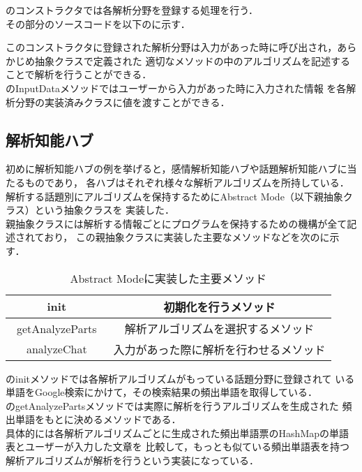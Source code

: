 のコンストラクタでは各解析分野を登録する処理を行う．\\
その部分のソースコードを以下のに示す．


このコンストラクタに登録された解析分野は入力があった時に呼び出され，あらかじめ抽象クラスで定義された
適切なメソッドの中のアルゴリズムを記述することで解析を行うことができる．
\\


のInputDataメソッドではユーザーから入力があった時に入力された情報
を各解析分野の実装済みクラスに値を渡すことができる．\\


\subsection{解析知能ハブ}
初めに解析知能ハブの例を挙げると，感情解析知能ハブや話題解析知能ハブに当たるものであり，
各ハブはそれぞれ様々な解析アルゴリズムを所持している．\\

解析する話題別にアルゴリズムを保持するためにAbstract Mode（以下親抽象クラス）という抽象クラスを
実装した．\\

親抽象クラスには解析する情報ごとにプログラムを保持するための機構が全て記述されており，
この親抽象クラスに実装した主要なメソッドなどを次のに示す．

\begin{table}[tbh]
	\caption{Abstract Modeに実装した主要メソッド} \label{tab:Abstract Mode}
	\begin{center}
		\begin{tabular}[htb]{c|c}
		\hline
		init & 初期化を行うメソッド \\ \hline
		getAnalyzeParts　& 解析アルゴリズムを選択するメソッド \\ \hline
		analyzeChat & 入力があった際に解析を行わせるメソッド \\ \hline
		\end{tabular}
	\end{center}
\end{table}


のinitメソッドでは各解析アルゴリズムがもっている話題分野に登録されて
いる単語をGoogle検索にかけて，その検索結果の頻出単語を取得している．
\\
のgetAnalyzePartsメソッドでは実際に解析を行うアルゴリズムを生成された
頻出単語をもとに決めるメソッドである．
\\
具体的には各解析アルゴリズムごとに生成された頻出単語票のHashMapの単語表とユーザーが入力した文章を
比較して，もっとも似ている頻出単語表を持つ解析アルゴリズムが解析を行うという実装になっている．
\\



